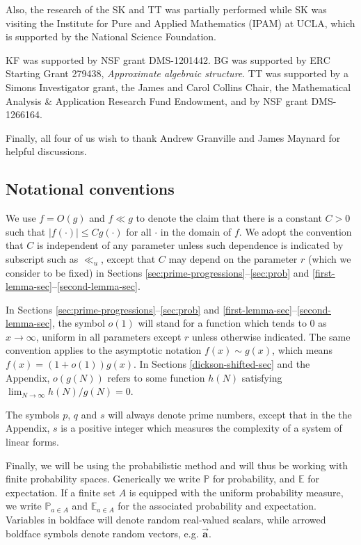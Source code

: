 \documentclass[12pt]{amsart}
\numberwithin{equation}{section}  %
\theoremstyle{remark}
\theoremstyle{plain}
\numberwithin{equation}{section}
\newcommand{\E}{\mathbb{E}}  %
\newcommand{\PR}{\mathbb{P}}  %
\newcommand{\Var}{\operatorname{Var}}  %
\renewcommand{\le}{\leqslant}
\renewcommand{\(}{\left(}
\renewcommand{\)}{\right)}
\newcommand{\asym}{\sim}   %
\newcommand{\rel}{\nsststile{}{}}  %
\newcommand{\vect}[1]{{\ensuremath{\vec{#1}}}}
\begin{document}
Also, the research of the SK and TT was partially
performed while SK was 
visiting the Institute for Pure and Applied Mathematics (IPAM) at UCLA,
which is supported by the National Science Foundation.

KF was supported by NSF grant DMS-1201442.
BG was supported by ERC Starting Grant 279438, \emph{Approximate algebraic structure}. 
TT was supported by a Simons Investigator grant, the
James and Carol Collins Chair, the Mathematical Analysis \&
Application Research Fund Endowment, and by NSF grant DMS-1266164. 

Finally, all four of us wish to thank Andrew Granville and James Maynard for helpful discussions.

\subsection{Notational conventions}\label{not-sec}
  
We use $f=O(g)$ and $f\ll g$ to denote the claim that there is a constant $C>0$ such that
$|f(\cdot)| \le C g(\cdot)$ for all $\cdot$ in the domain of $f$.
We adopt the convention that $C$ is independent of any parameter
unless such dependence is indicated by subscript such as  $\ll_u$,
except that $C$ may depend on the parameter $r$ (which we consider to
be fixed) in Sections
\ref{sec:prime-progressions}--\ref{sec:prob} and 
\ref{first-lemma-sec}--\ref{second-lemma-sec}.

In  Sections
\ref{sec:prime-progressions}--\ref{sec:prob} and
\ref{first-lemma-sec}--\ref{second-lemma-sec}, 
the symbol $o(1)$ will stand for a function which tends
to $0$ as $x\to\infty$, uniform in all parameters except $r$ unless 
otherwise indicated.
The same convention applies to the asymptotic
notation%
$f(x) \asym g(x)$, which means $f(x)=(1+o(1))g(x)$.
In Sections \ref{dickson-shifted-sec} and the Appendix, $o(g(N))$
refers to some function $h(N)$ satisfying $\lim_{N\to\infty} h(N)/g(N)=0$.

The symbols $p$, $q$ and $s$ will always denote prime numbers,
except that in the the Appendix,
$s$ is a positive integer which measures the complexity of a 
system of linear forms.

Finally, we will be using the probabilistic method and will thus be working with finite probability spaces.
Generically we write $\PR$ for probability, and $\E$ for expectation. %
If a finite set $A$ is equipped with the uniform probability measure,
we write $\PR_{a\in A}$ and $\E_{a\in A}$ for the associated probability and
expectation.  Variables in boldface will denote random real-valued scalars,
while arrowed boldface symbols denote random vectors, e.g.
$\vect{\mathbf{a}}$.
\end{document}

